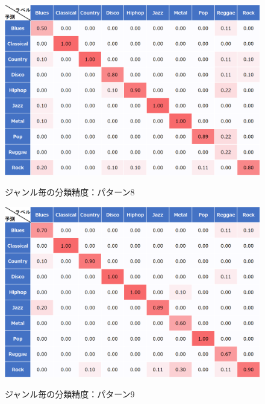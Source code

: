 \begin{figure}[htbp]
	\begin{center}
		\includegraphics[scale=0.5]{./images/classify-model/mel8_matrix.png}
		\caption{ジャンル毎の分類精度：パターン8}
		\label{fig:CNN8}
		\vspace{50pt}
		\includegraphics[scale=0.5]{./images/classify-model/mel9_matrix.png}
		\caption{ジャンル毎の分類精度：パターン9}
		\label{fig:CNN9}
	\end{center}
\end{figure}
\clearpage
